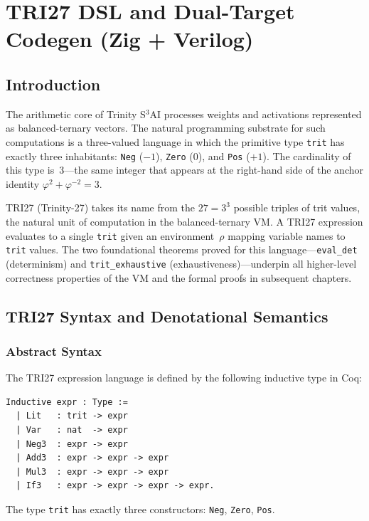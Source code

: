 \chapter{TRI27 DSL and Dual-Target Codegen (Zig + Verilog)}
\label{ch:27b}

\section{Introduction}

The arithmetic core of Trinity S$^3$AI processes weights and activations represented as balanced-ternary vectors. The natural programming substrate for such computations is a three-valued language in which the primitive type \texttt{trit} has exactly three inhabitants: \texttt{Neg} ($-1$), \texttt{Zero} ($0$), and \texttt{Pos} ($+1$). The cardinality of this type is~3---the same integer that appears at the right-hand side of the anchor identity $\varphi^2 + \varphi^{-2} = 3$.

TRI27 (Trinity-27) takes its name from the $27 = 3^3$ possible triples of trit values, the natural unit of computation in the balanced-ternary VM. A TRI27 expression evaluates to a single \texttt{trit} given an environment~$\rho$ mapping variable names to \texttt{trit} values. The two foundational theorems proved for this language---\texttt{eval\_det} (determinism) and \texttt{trit\_exhaustive} (exhaustiveness)---underpin all higher-level correctness properties of the VM and the formal proofs in subsequent chapters.

\section{TRI27 Syntax and Denotational Semantics}

\subsection{Abstract Syntax}

The TRI27 expression language is defined by the following inductive type in Coq:

\begin{verbatim}
Inductive expr : Type :=
  | Lit   : trit -> expr
  | Var   : nat  -> expr
  | Neg3  : expr -> expr
  | Add3  : expr -> expr -> expr
  | Mul3  : expr -> expr -> expr
  | If3   : expr -> expr -> expr -> expr.
\end{verbatim}

The type \texttt{trit} has exactly three constructors: \texttt{Neg}, \texttt{Zero}, \texttt{Pos}.

